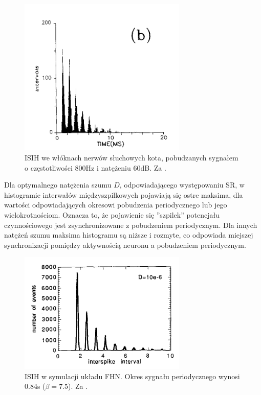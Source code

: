   \begin{figure}
    \includegraphics[width=80mm]{images/longtin_fig1b.png}
    \caption{ISIH we włóknach nerwów słuchowych kota, pobudzanych sygnałem o częstotliwości 800Hz i natężeniu 60dB. Za \cite{longtin}.}
    \label{fig:graphics:longtin1b}
  \end{figure}

  Dla optymalnego natężenia szumu $D$, odpowiadającego występowaniu SR, w histogramie interwałów międzyszpilkowych pojawiają się ostre maksima, dla wartości odpowiadających okresowi pobudzenia periodycznego lub jego wielokrotnościom. Oznacza to, że pojawienie się ''szpilek'' potencjału czynnościowego jest zsynchronizowane z pobudzeniem periodycznym. Dla innych natężeń szumu maksima histogramu są niższe i rozmyte, co odpowiada miejszej synchronizacji pomiędzy aktywnością neuronu a pobudzeniem periodycznym.


  \begin{figure}
    \includegraphics[width=80mm]{images/longtin_fig5a.png}
    \caption{ISIH w symulacji układu FHN. Okres sygnału periodycznego wynosi 0.84s ($\beta = 7.5$). Za \cite{longtin}.}
    \label{fig:graphics:longtin5a}
  \end{figure}  


